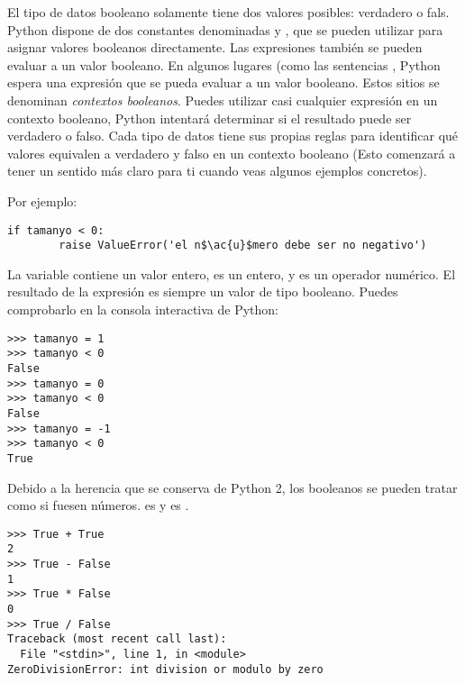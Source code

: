
El tipo de datos booleano solamente tiene dos valores posibles: verdadero o fals. Python dispone de dos constantes denominadas  y , que se pueden utilizar para asignar valores booleanos directamente. Las expresiones también se pueden evaluar a un valor booleano. En algunos lugares (como las sentencias , Python espera una expresión que se pueda evaluar a un valor booleano. Estos sitios se denominan \emph{contextos booleanos}. Puedes utilizar casi cualquier expresión en un contexto booleano, Python intentará determinar si el resultado puede ser verdadero o falso. Cada tipo de datos tiene sus propias reglas para identificar qué valores equivalen a verdadero y falso en un contexto booleano (Esto comenzará a tener un sentido más claro para ti cuando veas algunos ejemplos concretos).

Por ejemplo:


\noindent\begin{minipage}{\textwidth}
\begin{lstlisting}[mathescape=True]
    if tamanyo < 0:
        raise ValueError('el n$\ac{u}$mero debe ser no negativo')
\end{lstlisting}
\end{minipage}

La variable  contiene un valor entero,  es un entero, y \codigo{<} es un operador numérico. El resultado de la expresión es siempre un valor de tipo booleano. Puedes comprobarlo en la consola interactiva de Python:


\noindent\begin{minipage}{\textwidth}
\begin{lstlisting}[mathescape=True]
>>> tamanyo = 1
>>> tamanyo < 0
False
>>> tamanyo = 0
>>> tamanyo < 0
False
>>> tamanyo = -1
>>> tamanyo < 0
True
\end{lstlisting}
\end{minipage}

Debido a la herencia que se conserva de Python 2, los booleanos se pueden tratar como si fuesen números.  es  y  es .

\noindent\begin{minipage}{\textwidth}
\begin{lstlisting}[mathescape=True]
>>> True + True
2
>>> True - False
1
>>> True * False
0
>>> True / False
Traceback (most recent call last):
  File "<stdin>", line 1, in <module>
ZeroDivisionError: int division or modulo by zero
\end{lstlisting}
\end{minipage}

